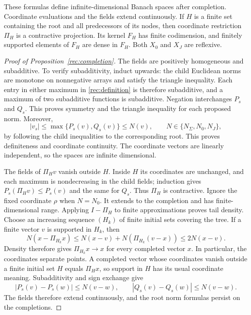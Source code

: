 \begin{proposition}\label{rec:completion}
These formulas define infinite-dimensional Banach spaces after completion.
Coordinate evaluations and the fields extend continuously. If $H$ is a
finite set containing the root and all predecessors of its nodes, then
coordinate restriction $\Pi_H$ is a contractive projection. Its kernel
$F_H$ has finite codimension, and finitely supported elements of $F_H$
are dense in $F_H$. Both $X_0$ and $X_J$ are reflexive.
\end{proposition}

\begin{proof}[Proof of Proposition~\ref{rec:completion}]
The fields are positively homogeneous and subadditive. To verify
subadditivity, induct upwards: the child Euclidean norms are monotone
on nonnegative arrays and satisfy the triangle inequality. Each entry
in either maximum in \eqref{rec:definition} is therefore subadditive,
and a maximum of two subadditive functions is subadditive. Negation
interchanges $P_s$ and $Q_s$. This proves symmetry and the triangle
inequality for each proposed norm. Moreover,
\[
 |v_s|\le\max\{P_s(v),Q_s(v)\}\le N(v),
 \qquad N\in\{N_\Sigma,N_0,N_J\},
\]
by following the child inequalities to the corresponding root.
This proves definiteness and coordinate continuity. The coordinate
vectors are linearly independent, so the spaces are infinite dimensional.

The fields of $\Pi_Hv$ vanish outside $H$. Inside $H$ its coordinates
are unchanged, and each maximum is nondecreasing in the child fields;
induction gives $P_s(\Pi_Hv)\le P_s(v)$ and the same for $Q_s$.
Thus $\Pi_H$ is contractive. Ignore the fixed coordinate $\rho$ when
$N=N_0$. It extends to the completion and has finite-dimensional range.
Applying $I-\Pi_H$ to finite approximations proves tail density.
Choose an increasing sequence $(H_k)$ of finite initial sets covering
the tree. If a finite vector $v$ is supported in $H_k$, then
\[
 N(x-\Pi_{H_k}x)
 \le N(x-v)+N(\Pi_{H_k}(v-x))\le2N(x-v).
\]
Density therefore gives $\Pi_{H_k}x\to x$ for every completed vector
$x$. In particular, the coordinates separate points. A completed
vector whose coordinates vanish outside a finite initial set $H$
equals $\Pi_Hx$, so support in $H$ has its usual coordinate meaning.
Subadditivity and sign exchange give
\[
 |P_s(v)-P_s(w)|\le N(v-w),\qquad
 |Q_s(v)-Q_s(w)|\le N(v-w).
\]
The fields therefore extend continuously, and the root norm formulas
persist on the completions.


\end{proof}
